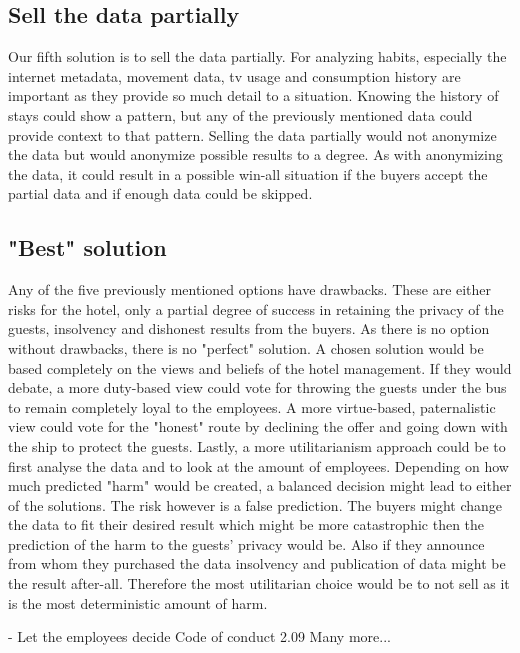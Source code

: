 \subsection{Sell the data partially}
Our fifth solution is to sell the data partially. For analyzing habits, especially the internet metadata, movement data, tv usage and consumption history are important as they provide so much detail to a situation. Knowing the history of stays could show a pattern, but any of the previously mentioned data could provide context to that pattern. Selling the data partially would not anonymize the data but would anonymize possible results to a degree. As with anonymizing the data, it could result in a possible win-all situation if the buyers accept the partial data and if enough data could be skipped.

\subsection{"Best" solution} 
Any of the five previously mentioned options have drawbacks. These are either risks for the hotel, only a partial degree of success in retaining the privacy of the guests, insolvency and dishonest results from the buyers. As there is no option without drawbacks, there is no "perfect" solution. A chosen solution would be based completely on the views and beliefs of the hotel management. If they would debate, a more duty-based view could vote for throwing the guests under the bus to remain completely loyal to the employees. A more virtue-based, paternalistic view could vote for the "honest" route by declining the offer and going down with the ship to protect the guests. Lastly, a more utilitarianism approach could be to first analyse the data and to look at the amount of employees. Depending on how much predicted "harm" would be created, a balanced decision might lead to either of the solutions. The risk however is a false prediction. The buyers might change the data to fit their desired result which might be more catastrophic then the prediction of the harm to the guests' privacy would be. Also if they announce from whom they purchased the data insolvency and publication of data might be the result after-all. Therefore the most utilitarian choice would be to not sell as it is the most deterministic amount of harm.



- Let the employees decide
Code of conduct 2.09
Many more...
